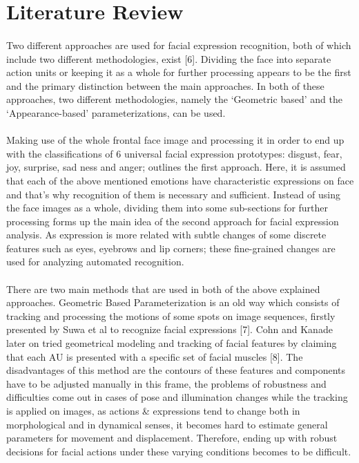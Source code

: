 \documentclass[a4paper,12pt,oneside]{article}
\begin{document}
\newpage
\section{Literature Review}
\paragraph{}
﻿Two different approaches are used for facial expression recognition, both of which include two
different methodologies, exist [6].  Dividing the face into separate action units or keeping it as
a whole for further processing appears to be the first and the primary distinction between the
main approaches.  In both of these approaches, two different methodologies, namely the
‘Geometric based’ and the ‘Appearance-based’ parameterizations, can be used.
\paragraph{}
Making use of the whole frontal face image and processing it in order to end up with the
classifications of 6 universal facial expression prototypes: disgust, fear, joy, surprise, sad ness
and anger; outlines the first approach. Here, it is assumed that each of the above mentioned
emotions have characteristic expressions on face and that’s why recognition of them is
necessary and sufficient. Instead of using the face images as a whole, dividing them into some
sub-sections for further processing forms up the main idea of the second approach for facial
expression analysis. As expression is more related with subtle changes of some discrete
features such as eyes, eyebrows and lip corners; these fine-grained changes are used for
analyzing automated recognition.
\paragraph{}
There are two main methods that are used in both of the above explained approaches. Geometric
Based Parameterization is an old way which consists of tracking and processing the motions
of some spots on image sequences, firstly presented by Suwa et al to recognize facial
expressions [7]. Cohn and Kanade later on tried geometrical modeling and tracking of facial
features by claiming that each AU is presented with a specific set of facial muscles [8]. The
disadvantages of this method are the contours of these features and components have to be
adjusted manually in this frame, the problems of robustness and difficulties come out in cases
of pose and illumination changes while the tracking is applied on images, as actions \&
expressions tend to change both in morphological and in dynamical senses, it becomes hard to
estimate general parameters for movement and displacement. Therefore, ending up with robust
decisions for facial actions under these varying conditions becomes to be difficult.
\end{document}
